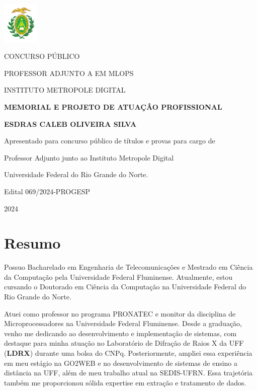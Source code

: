 \documentclass[10pt,a4paper,oneside]{book}
\newcommand{\Year}{2024}
\newcommand{\Author}{Esdras Caleb Oliveira Silva}
\newcommand{\UFF}{Universidade Federal Fluminense}
\newcommand{\UFRN}{Universidade Federal do Rio Grande do Norte}
\begin{document}
\pagestyle{plain}
\frontmatter

\begin{titlepage}
  \begin{center}
    \includegraphics[height=2cm]{images/logo.pdf}
    \vspace{1cm}

    CONCURSO PÚBLICO

    PROFESSOR ADJUNTO A EM MLOPS

    INSTITUTO METROPOLE DIGITAL
    \vspace{5cm}

    \textbf{\LARGE MEMORIAL E PROJETO DE ATUAÇÂO PROFISSIONAL}
    \vspace{1cm}

    \textbf{\LARGE \MakeUppercase{\Author{}}}
    \vspace{5cm}

    {\small
      Apresentado para concurso público de títulos e provas para cargo de

      Professor Adjunto junto ao Instituto Metropole Digital

      Universidade Federal do Rio Grande do Norte.
      \vspace{1cm}

      Edital 069/2024-PROGESP
    }
    \vfill

    \Year{}
  \end{center}
\end{titlepage}

\chapter*{Resumo}

Possuo Bacharelado em Engenharia de Telecomunicações e Mestrado em Ciência da Computação pela \UFF{}.
Atualmente, estou cursando o Doutorado em Ciência da Computação na \UFRN{}.

Atuei como professor no programa PRONATEC e monitor da disciplina de Microprocessadores na \UFF{}. Desde a graduação,
venho me dedicando ao desenvolvimento e implementação de sistemas, com destaque para minha atuação no Laboratório de
Difração de Raios X da UFF (\textbf{LDRX}) durante uma bolsa do CNPq. Posteriormente, ampliei essa experiência em meu
estágio na GO2WEB e no desenvolvimento de sistemas de ensino a distância na UFF, além de meu trabalho atual na SEDIS-UFRN.
Essa trajetória também me proporcionou sólida expertise em extração e tratamento de dados.
\end{document}
